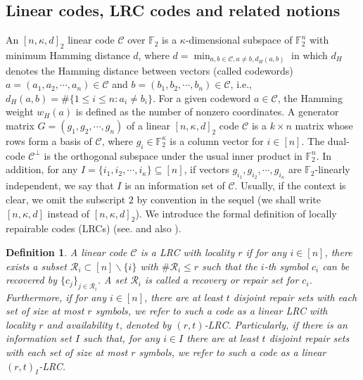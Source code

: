 \documentclass[10pt]{article}
\newtheorem{definition}{Definition}
\newcommand{\F}{\mathbb{F}}
\newcommand{\0}{\textbf{0}}
\newcommand{\1}{\textbf{1}}
\newcommand{\C}{{\mathcal C}}
\begin{document}
\subsection{Linear codes, LRC codes and related notions}
An $[n, \kappa, d]_2$ linear code $\mathcal{C}$ over $\F_2$
is a $\kappa$-dimensional subspace of $\F_2^n$ with minimum Hamming distance $d$, where
$d=\min_{a,b\in\mathcal{C}, a\neq b, d_H(a,b)}$ in which $d_H$ denotes the Hamming distance
between vectors (called codewords) $a=(a_1,a_2,\cdots,a_n)\in\mathcal{C}$ and $b=(b_1,b_2,\cdots,b_n)\in\mathcal{C}$,
i.e., $d_H(a,b)=\#\{1\leq i\leq n : a_i\not=b_i\}$.
For a given codeword $a\in\mathcal{C}$, the Hamming weight ${w_H}(a)$
is defined as the number of nonzero coordinates.
 {\color{red} A generator matrix $G=(g_1,g_2,\cdots, g_n)$ of a linear $[n, \kappa, d]_2$ code $\mathcal{C}$ is a
$k\times n$ matrix whose rows form a basis of $\mathcal{C}$, where $g_i\in\F_2^\kappa$ is a column vector for $i\in [n]$.
The dual-code $\mathcal{C}^\perp$ is the orthogonal subspace under the usual inner product in $\F_2^n$.
In addition, for any $I=\{i_1,i_2,\cdots,i_\kappa\}\subseteq [n]$, if vectors $g_{i_1}, g_{i_2},\cdots, g_{i_\kappa}$ are $\F_2$-linearly independent,
we say that $I$ is an information set of $\mathcal{C}$.}
Usually, if the context is clear, we omit the subscript $2$ by convention in the sequel (we shall write $[n, \kappa, d]$ instead of $[n, \kappa, d]_2$).
We introduce the formal definition of locally repairable codes (LRCs) (see. \cite{Gopalan-et-al} and also \cite{Tamo-Barg-2014}).
\begin{definition}\label{def:LRC}
 A linear code $\C$ is a LRC with locality $r$ if for any $i\in[n]$, there exists a subset
 $\mathcal R_i\subset[n]\backslash\{i\}$ with $\#\mathcal R_i\leq r$ such that the $i$-th symbol $c_i$ can be recovered
 by $\{c_j\}_{j\in \mathcal R_i}$.
A set $\mathcal R_i$ is called a recovery or repair set for $c_i$.
Furthermore,  if for any $i\in[n]$, there are at least $t$ disjoint repair
sets with each set of size at most $r$ symbols, we refer to such a code as {\color{red}a linear LRC with
locality $r$ and availability $t$, denoted by $(r,t)$-LRC.
Particularly, if there is an information set $I$  such that, for any $i\in I$ there are at least $t$ disjoint repair
sets with each set of size at most $r$ symbols, we refer to such a code as a linear $(r,t)_{I}$-LRC.}
\end{definition}
\end{document}
